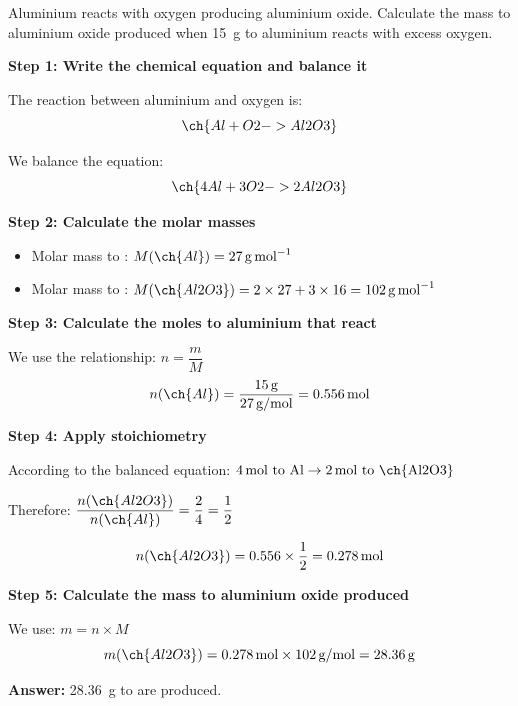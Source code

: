 \begin{exercise}
    Aluminium reacts with oxygen producing aluminium oxide.
    Calculate the mass to aluminium oxide produced when \qty{15}{\g} to aluminium reacts with excess oxygen.
    \begin{solu}
        \textbf{Step 1: Write the chemical equation and balance it}

        The reaction between aluminium and oxygen is:
        \begin{equation*}
            \ch{Al + O2 -> Al2O3}
        \end{equation*}

        We balance the equation:
        \begin{equation*}
            \ch{4 Al + 3 O2 -> 2 Al2O3}
        \end{equation*}

        \textbf{Step 2: Calculate the molar masses}

        \begin{itemize}
            \item Molar mass to : $M(\ch{Al}) = \qty{27}{\g\per\mol}$
            \item Molar mass to : $M(\ch{Al2O3}) = 2 \times 27 + 3 \times 16 = \qty{102}{\g\per\mol}$
        \end{itemize}

        \textbf{Step 3: Calculate the moles to aluminium that react}

        We use the relationship: $n = \dfrac{m}{M}$
        \begin{equation*}
            n(\ch{Al}) = \frac{15\,\text{g}}{27\,\text{g/mol}} = 0.556\,\text{mol}
        \end{equation*}

        \textbf{Step 4: Apply stoichiometry}

        According to the balanced equation: $4\,\text{mol to Al} \rightarrow 2\,\text{mol to \ch{Al2O3}}$

        Therefore: $\dfrac{n(\ch{Al2O3})}{n(\ch{Al})} = \dfrac{2}{4} = \dfrac{1}{2}$

        \begin{equation*}
            n(\ch{Al2O3}) = 0.556 \times \frac{1}{2} = 0.278\,\text{mol}
        \end{equation*}

        \textbf{Step 5: Calculate the mass to aluminium oxide produced}

        We use: $m = n \times M$
        \begin{equation*}
            m(\ch{Al2O3}) = 0.278\,\text{mol} \times 102\,\text{g/mol} = \qty{28.36}{\g}
        \end{equation*}

        \textbf{Answer:} \qty{28.36}{\g} to  are produced.
    \end{solu}
\end{exercise}

